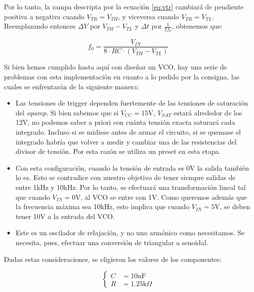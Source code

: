 \documentclass[../../tc_tp6_main.tex]{subfiles}
\begin{document}
Por lo tanto, la rampa descripta por la ecuaci\'on \ref{eq:vtr} cambiar\'a de pendiente positiva a negativa cuando $V_{TR} = V_{TH}$, y viceversa cuando $V_{TR} = V_{TL}$. Reemplazando entonces $\Delta V$ por $V_{TH} - V_{TL}$ y $\Delta t$ por $\frac{1}{2f_0}$, obtenemos que:

\begin{equation}
	f_0 = \frac{V_{IN}}{8\cdot RC\cdot (V_{TH} - V_{TL})}
	\label{eq:frecuencia}
\end{equation}

Si bien hemos cumplido hasta aqu\'i con dise\~nar un VCO, hay una serie de problemas con esta implementaci\'on en cuanto a lo pedido por la consigna, las cuales se enfrentar\'an de la siguiente manera:

\begin{itemize}
	\item Las tensiones de trigger dependen fuertemente de las tensiones de saturaci\'on del \textit{opamp}. Si bien sabemos que si $V_{CC} = 15\mathrm{V}$, $V_{SAT}$ estar\'a alrededor de los 12V, no podemos saber a priori con cu\'anta tensi\'on exacta saturar\'a cada integrado. Incluso si se midiese antes de armar el circuito, si se quemase el integrado habr\'ia que volver a medir y cambiar una de las resistencias del divisor de tensi\'on. Por esta raz\'on se utiliza un preset en esta etapa.
	\item Con esta configuraci\'on, cuando la tensi\'on de entrada es 0V la salida tambi\'en lo es. Esto se contradice con nuestro objetivo de tener siempre salidas de entre 1kHz y 10kHz. Por lo tanto, se efectuar\'a una transformaci\'on lineal tal que cuando $V_{IN} = 0\mathrm{V}$, al VCO se entre con 1V. Como queremos adem\'as que la frecuencia m\'axima sea 10kHz, esto implica que cuando $V_{IN}=5\mathrm{V}$, se deben tener 10V a la entrada del VCO.
	\item Este es un oscilador de relajaci\'on, y no uno arm\'onico como necesitamos. Se necesita, pues, efectuar una conversi\'on de triangular a senoidal. 
\end{itemize}

Dadas estas consideraciones, se eligieron los valores de los componentes:

\begin{equation}
	\left\{
	\begin{aligned}
		C &= 10\mathrm{nF} \\
		R &= 1.25\mathrm{k}\Omega
	\end{aligned}
	\right.
\end{equation}
\end{document}
